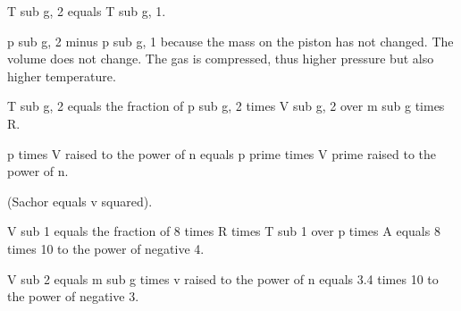 T sub g, 2 equals T sub g, 1.

p sub g, 2 minus p sub g, 1 because the mass on the piston has not changed. The volume does not change. The gas is compressed, thus higher pressure but also higher temperature.

T sub g, 2 equals the fraction of p sub g, 2 times V sub g, 2 over m sub g times R.

p times V raised to the power of n equals p prime times V prime raised to the power of n.

(Sachor equals v squared).

V sub 1 equals the fraction of 8 times R times T sub 1 over p times A equals 8 times 10 to the power of negative 4.

V sub 2 equals m sub g times v raised to the power of n equals 3.4 times 10 to the power of negative 3.